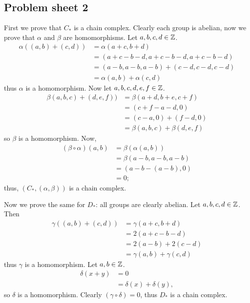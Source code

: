 \begin{questions}
  \section{Problem sheet 2}
  \setcounter{question}{1}
  \question \hspace{0em}
  \begin{solution}
    First we prove that $C_*$ is a chain complex. 
    Clearly each group is abelian, now we prove that $\alpha$ and $\beta$ are homomorphisms.
    Let $a,b,c,d \in \mathbb{Z}$.
    \begin{align*}
      \alpha((a,b) + (c,d))
      &= \alpha(a + c, b + d) \\
      &= (a + c - b - d, a + c - b - d, a + c - b - d) \\
      &= (a - b, a - b, a - b) + (c - d, c - d, c - d) \\
      &= \alpha(a,b) + \alpha(c,d)
    \end{align*}
    thus $\alpha$ is a homomorphism.
    Now let $a,b,c,d,e,f \in \mathbb{Z}$.
    \begin{align*}
      \beta(a,b,c) + (d,e,f))
      &= \beta(a + d, b + e, c + f) \\
      &= (c + f - a - d, 0) \\
      &= (c - a, 0) + (f - d, 0) \\
      &= \beta(a,b,c) + \beta(d,e,f)
    \end{align*}
    so $\beta$ is a homomorphism.
    Now,
    \begin{align*}
      (\beta \circ \alpha)(a,b) 
      &= \beta(\alpha(a,b)) \\
      &= \beta(a-b, a-b, a-b) \\
      &= (a-b - (a-b), 0) \\
      &= 0;
    \end{align*}
    thus, $(C_*, (\alpha, \beta))$ is a chain complex.

    Now we prove the same for $D_*$: all groups are clearly abelian.
    Let $a,b,c,d \in \mathbb{Z}$.
    Then
    \begin{align*}
      \gamma((a,b) + (c,d))
      &= \gamma(a+c, b+d) \\
      &= 2(a + c -b - d) \\
      &= 2(a - b) + 2(c - d) \\
      &= \gamma(a,b) + \gamma(c,d)
    \end{align*}
    thus $\gamma$ is a homomorphism.
    Let $a,b \in \mathbb{Z}$.
    \begin{align*}
      \delta(x + y)
      &= 0 \\
      &= \delta(x) + \delta(y),
    \end{align*}
    so $\delta$ is a homomorphism.
    Clearly $(\gamma \circ \delta) = 0$, thus $D_*$ is a chain complex.


\end{solution}
\end{questions}
